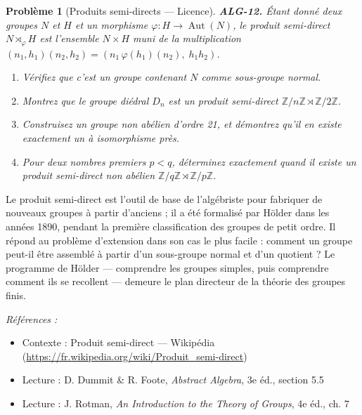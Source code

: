 \documentclass[11pt]{article}
\newtheorem{problem}{Problème}
\newenvironment{refs}{\par\small\noindent\emph{Références :}\begin{itemize}\setlength\itemsep{0pt}}{\end{itemize}\normalsize}
\begin{document}
\bigskip

\begin{problem}[{Produits semi-directs --- Licence}]
\textbf{ALG-12.} Étant donné deux groupes $N$ et $H$ et un morphisme
$\varphi : H \to \operatorname{Aut}(N)$, le \textit{produit semi-direct}
$N \rtimes_\varphi H$ est l'ensemble $N \times H$ muni de la multiplication
$(n_1, h_1)(n_2, h_2) = (n_1 \, \varphi(h_1)(n_2), \; h_1 h_2)$.
\begin{enumerate}
\item[(i)] Vérifiez que c'est un groupe
contenant $N$ comme sous-groupe normal.
\item[(ii)] Montrez que le groupe diédral $D_n$ est un
produit semi-direct $\mathbb{Z}/n\mathbb{Z} \rtimes \mathbb{Z}/2\mathbb{Z}$.
\item[(iii)] Construisez
un groupe non abélien d'ordre 21, et démontrez qu'il en existe exactement un à isomorphisme près.
\item[(iv)] Pour deux nombres premiers $p < q$, déterminez exactement quand il existe un produit semi-direct
non abélien $\mathbb{Z}/q\mathbb{Z} \rtimes \mathbb{Z}/p\mathbb{Z}$.
\end{enumerate}

\end{problem}

\noindent Le produit semi-direct est l'outil de base de l'algébriste pour fabriquer de nouveaux
groupes à partir d'anciens ; il a été formalisé par Hölder dans les années 1890, pendant la première
classification des groupes de petit ordre. Il répond au \og{} problème d'extension \fg{} dans son cas le plus
facile : comment un groupe peut-il être assemblé à partir d'un sous-groupe normal et d'un quotient ? Le
programme de Hölder --- comprendre les groupes simples, puis comprendre comment ils se recollent --- demeure le
plan directeur de la théorie des groupes finis.

\begin{refs}
\item Contexte : Produit semi-direct --- Wikipédia (\url{https://fr.wikipedia.org/wiki/Produit_semi-direct})
\item Lecture : D. Dummit \& R. Foote, \textit{Abstract Algebra}, 3e éd., section 5.5
\item Lecture : J. Rotman, \textit{An Introduction to the Theory of Groups}, 4e éd., ch. 7
\end{refs}

\bigskip
\end{document}
